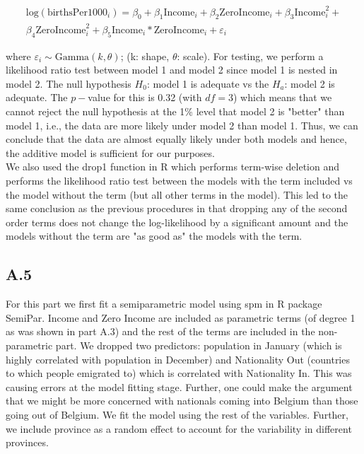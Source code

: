 \documentclass[paper=a4, fontsize=11pt]{scrartcl} %
\numberwithin{equation}{section} %
\begin{document}
\begin{eqnarray*}
\text{log}(\text{birthsPer1000}_i) = \beta_0 + \beta_1\text{Income}_i + \beta_2\text{ZeroIncome}_i + \beta_3\text{Income}^2_i + \\
\beta_4\text{ZeroIncome}^2_i + \beta_5\text{Income}_i * \text{ZeroIncome}_i + \varepsilon_i
\end{eqnarray*}

where $\varepsilon_i  \sim \text{Gamma}(k, \theta)$; (k: shape, $\theta$: scale). For testing, we perform a likelihood ratio test between model 1 and model 2 since model 1 is nested in model 2. The null hypothesis $H_0$: model 1 is adequate vs the $H_a$: model 2 is adequate. The $p-$value for this is 0.32 (with $df=3$) which means that we cannot reject the null hypothesis at the 1\% level that model 2 is "better" than model 1, i.e., the data are more likely under model 2 than model 1. Thus, we can conclude that the data are almost equally likely under both models and hence, the additive model is sufficient for our purposes.\\

We also used the drop1 function in R which performs term-wise deletion and performs the likelihood ratio test between the models with the term included vs the model without the term (but all other terms in the model). This led to the same conclusion as the previous procedures in that dropping any of the second order terms does not change the log-likelihood by a significant amount and the models without the term are "as good as" the models with the term.

\subsection{A.5}

For this part we first fit a semiparametric model using spm in R package SemiPar. Income and Zero Income are included as parametric terms (of degree 1 as was shown in part A.3) and the rest of the terms are included in the non-parametric part. We dropped two predictors: population in January (which is highly correlated with population in December) and Nationality Out (countries to which people emigrated to) which is correlated with Nationality In. This was causing errors at the model fitting stage. Further, one could make the argument that we might be more concerned with nationals coming into Belgium than those going out of Belgium. We fit the model using the rest of the variables. Further, we include province as a random effect to account for the variability in different provinces.\\
\end{document}
